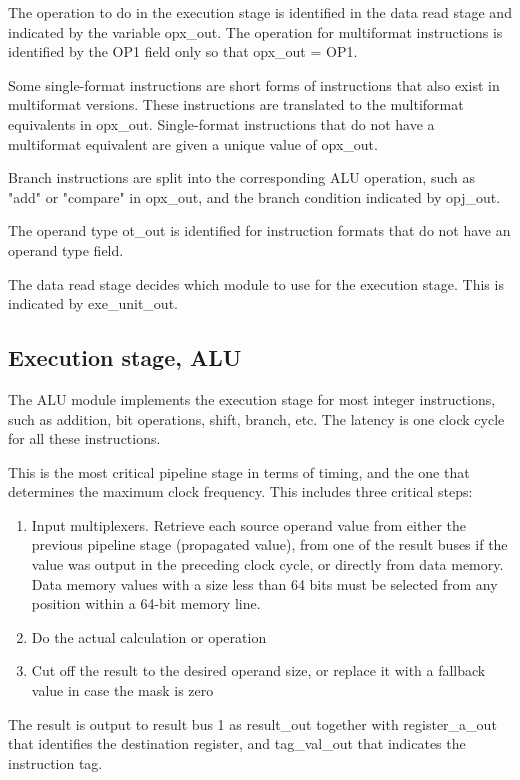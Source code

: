 \documentclass[11pt,a4paper,oneside,openright]{report}
\newcommand{\vv}{ \vspace{2mm} }   %
\begin{document}
The operation to do in the execution stage is identified in the data read stage and indicated by the variable opx\_out. The operation for multiformat instructions is identified by the OP1 field only so that opx\_out = OP1.
\vv

Some single-format instructions are short forms of instructions that also exist in multiformat versions. These instructions are translated to the multiformat equivalents in opx\_out. Single-format instructions that do not have a multiformat equivalent are given a unique value of opx\_out.
\vv

Branch instructions are split into the corresponding ALU operation, such as "add" or "compare" in opx\_out, and the branch condition indicated by opj\_out.
\vv

The operand type ot\_out is identified for instruction formats that do not have an operand type field.
\vv

The data read stage decides which module to use for the execution stage. This is indicated by exe\_unit\_out.
\vv


\subsection{Execution stage, ALU}
The ALU module implements the execution stage for most integer instructions, such as addition, bit operations, shift, branch, etc. The latency is one clock cycle for all these instructions.
\vv

This is the most critical pipeline stage in terms of timing, and the one that determines the maximum clock frequency. This includes three critical steps:
\begin{enumerate}
\item Input multiplexers. Retrieve each source operand value from either the previous pipeline stage (propagated value), from one of the result buses if the value was output in the preceding clock cycle, or directly from data memory. Data memory values with a size less than 64 bits must be selected from any position within a 64-bit memory line.
\item Do the actual calculation or operation
\item Cut off the result to the desired operand size, or replace it with a fallback value in case the mask is zero
\end{enumerate}
\vv

The result is output to result bus 1 as result\_out together with register\_a\_out that identifies the destination register, and tag\_val\_out that indicates the instruction tag.
\vv
\end{document}
